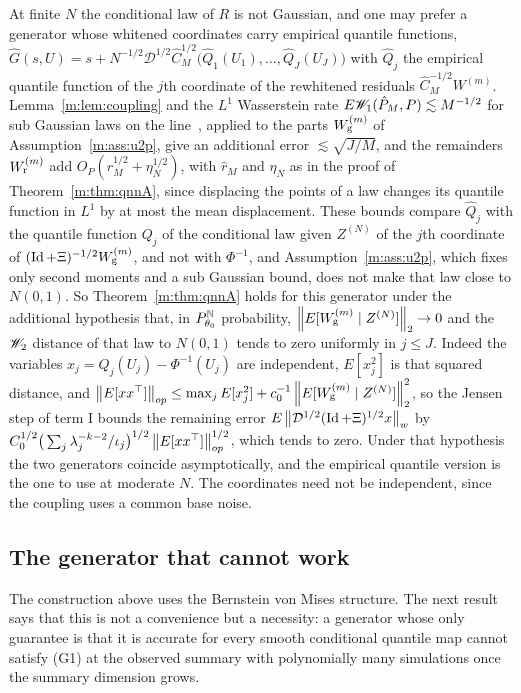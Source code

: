 \begin{remark}\label{m:rem:emp}
At finite $N$ the conditional law of $R$ is not Gaussian, and one may prefer a generator whose whitened coordinates carry empirical quantile functions, $\widehat G(s,U)=s+N^{-1/2}\mathcal D^{1/2}\hat C_M^{1/2}\big(\hat Q_1(U_1),\dots,\hat Q_J(U_J)\big)$ with $\hat Q_j$ the empirical quantile function of the $j$th coordinate of the rewhitened residuals $\hat C_M^{-1/2}W^{(m)}$. Lemma~\ref{m:lem:coupling} and the $L^1$ Wasserstein rate $E\mathscr{W}_1(\hat P_M,P)\lesssim M^{-1/2}$ for sub Gaussian laws on the line~\cite{bobkovledoux2019}, applied to the parts $W^{(m)}_{\rm g}$ of Assumption~\ref{m:ass:u2p}, give an additional error $\lesssim\sqrt{J/M}$, and the remainders $W^{(m)}_{\rm r}$ add $O_P(\hat r_M^{1/2}+\eta_N^{1/2})$, with $\hat r_M$ and $\eta_N$ as in the proof of Theorem~\ref{m:thm:qnnA}, since displacing the points of a law changes its quantile function in $L^1$ by at most the mean displacement. These bounds compare $\hat Q_j$ with the quantile function $Q_j$ of the conditional law given $Z^{(N)}$ of the $j$th coordinate of $(\operatorname{Id}+\Xi)^{-1/2}W^{(m)}_{\rm g}$, and not with $\Phi^{-1}$, and Assumption~\ref{m:ass:u2p}, which fixes only second moments and a sub Gaussian bound, does not make that law close to $N(0,1)$. So Theorem~\ref{m:thm:qnnA} holds for this generator under the additional hypothesis that, in $P^{\mathbb{N}}_{\theta_0}$ probability, $\left\|E[W^{(m)}_{\rm g}\mid Z^{(N)}]\right\|_2\to0$ and the $\mathscr{W}_2$ distance of that law to $N(0,1)$ tends to zero uniformly in $j\le J$. Indeed the variables $x_j=Q_j(U_j)-\Phi^{-1}(U_j)$ are independent, $E[x_j^2]$ is that squared distance, and $\left\|E[xx^\top]\right\|_{op}\le\max_jE[x_j^2]+c_0^{-1}\left\|E[W^{(m)}_{\rm g}\mid Z^{(N)}]\right\|^2_2$, so the Jensen step of term I bounds the remaining error $E\left\|\mathcal D^{1/2}(\operatorname{Id}+\Xi)^{1/2}x\right\|_w$ by $C_0^{1/2}\big(\sum_j\lambda_j^{-k-2}/\iota_j\big)^{1/2}\left\|E[xx^\top]\right\|^{1/2}_{op}$, which tends to zero. Under that hypothesis the two generators coincide asymptotically, and the empirical quantile version is the one to use at moderate $N$. The coordinates need not be independent, since the coupling uses a common base noise.
\end{remark}

\subsection{The generator that cannot work}

The construction above uses the Bernstein von Mises structure. The next result says that this is not a convenience but a necessity: a generator whose only guarantee is that it is accurate for every smooth conditional quantile map cannot satisfy (G1) at the observed summary with polynomially many simulations once the summary dimension grows.

